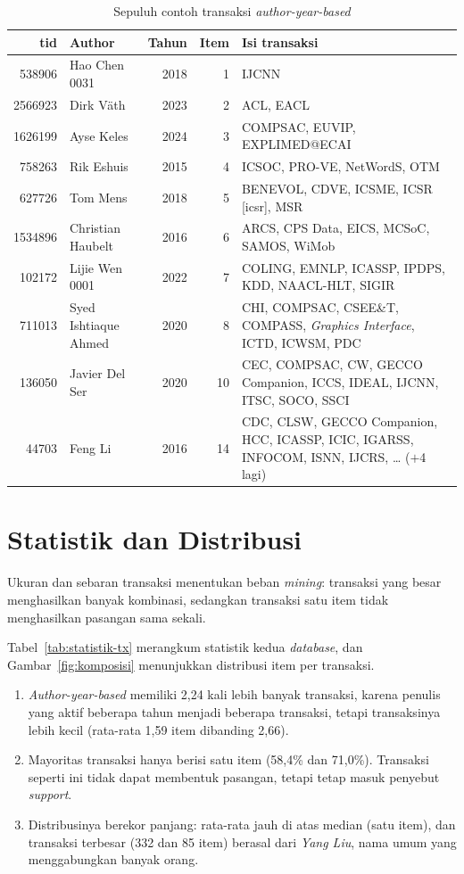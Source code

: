 \begin{table}[!htb]
\caption{Sepuluh contoh transaksi \textit{author-year-based}}
\label{tab:contoh-ay}
\footnotesize
\begin{tabularx}{\textwidth}{@{}rlrrX@{}}
\toprule
\textbf{tid} & \textbf{Author} & \textbf{Tahun} & \textbf{Item} & \textbf{Isi transaksi} \\
\midrule
538906 & Hao Chen 0031 & 2018 & 1 & IJCNN \\
2566923 & Dirk Väth & 2023 & 2 & ACL, EACL \\
1626199 & Ayse Keles & 2024 & 3 & COMPSAC, EUVIP, EXPLIMED@ECAI \\
758263 & Rik Eshuis & 2015 & 4 & ICSOC, PRO-VE, NetWordS, OTM \\
627726 & Tom Mens & 2018 & 5 & BENEVOL, CDVE, ICSME, ICSR [icsr], MSR \\
1534896 & Christian Haubelt & 2016 & 6 & ARCS, CPS Data, EICS, MCSoC, SAMOS, WiMob \\
102172 & Lijie Wen 0001 & 2022 & 7 & COLING, EMNLP, ICASSP, IPDPS, KDD, NAACL-HLT, SIGIR \\
711013 & Syed Ishtiaque Ahmed & 2020 & 8 & CHI, COMPSAC, CSEE\&T, COMPASS, \textit{Graphics Interface}, ICTD, ICWSM, PDC \\
136050 & Javier Del Ser & 2020 & 10 & CEC, COMPSAC, CW, GECCO Companion, ICCS, IDEAL, IJCNN, ITSC, SOCO, SSCI \\
44703 & Feng Li & 2016 & 14 & CDC, CLSW, GECCO Companion, HCC, ICASSP, ICIC, IGARSS, INFOCOM, ISNN, IJCRS, \ldots{} ($+$4 lagi) \\
\bottomrule
\end{tabularx}
\end{table}

\section{Statistik dan Distribusi}
\label{sec:hasil-statistik-tx}
Ukuran dan sebaran transaksi menentukan beban \textit{mining}: transaksi yang besar menghasilkan banyak kombinasi, sedangkan transaksi satu item tidak menghasilkan pasangan sama sekali.

Tabel~\ref{tab:statistik-tx} merangkum statistik kedua \textit{database}, dan Gambar~\ref{fig:komposisi} menunjukkan distribusi item per transaksi.
\begin{enumerate}
\item \textit{Author-year-based} memiliki 2,24 kali lebih banyak transaksi, karena penulis yang aktif beberapa tahun menjadi beberapa transaksi, tetapi transaksinya lebih kecil (rata-rata 1,59 item dibanding 2,66).
\item Mayoritas transaksi hanya berisi satu item (58,4\% dan 71,0\%). Transaksi seperti ini tidak dapat membentuk pasangan, tetapi tetap masuk penyebut \textit{support}.
\item Distribusinya berekor panjang: rata-rata jauh di atas median (satu item), dan transaksi terbesar (332 dan 85 item) berasal dari \textit{Yang Liu}, nama umum yang menggabungkan banyak orang.
\end{enumerate}

